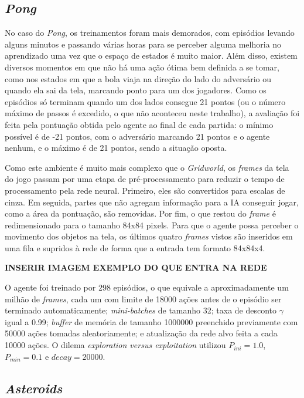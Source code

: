 \subsection{\textit{Pong}}
\label{sec:exp_pong}

No caso do \textit{Pong}, os treinamentos foram mais demorados, com episódios levando alguns minutos e passando várias horas para se perceber alguma melhoria no aprendizado uma vez que o espaço de estados é muito maior.
Além disso, existem diversos momentos em que não há uma ação ótima bem definida a se tomar, como nos estados em que a bola viaja na direção do lado do adversário ou quando ela sai da tela, marcando ponto para um dos jogadores.
Como os episódios só terminam quando um dos lados consegue 21 pontos (ou o número máximo de passos é excedido, o que não aconteceu neste trabalho), a avaliação foi feita pela pontuação obtida pelo agente ao final de cada partida:
o mínimo possível é de -21 pontos, com o adversário marcando 21 pontos e o agente nenhum, e o máximo é de 21 pontos, sendo a situação oposta.

Como este ambiente é muito mais complexo que o \textit{Gridworld}, os \textit{frames} da tela do jogo passam por uma etapa de pré-processamento para reduzir o tempo de processamento pela rede neural.
Primeiro, eles são convertidos para escalas de cinza.
Em seguida, partes que não agregam informação para a IA conseguir jogar, como a área da pontuação, são removidas.
Por fim, o que restou do \textit{frame} é redimensionado para o tamanho 84x84 pixels.
Para que o agente possa perceber o movimento dos objetos na tela, os últimos quatro \textit{frames} vistos são inseridos em uma fila e supridos à rede de forma que a entrada tem formato 84x84x4.

\textbf{INSERIR IMAGEM EXEMPLO DO QUE ENTRA NA REDE}

O agente foi treinado por 298 episódios, o que equivale a aproximadamente um milhão de \textit{frames}, cada um com limite de 18000 ações antes de o episódio ser terminado automaticamente;
\textit{mini-batches} de tamanho 32; taxa de desconto $\gamma$ igual a 0.99;
\textit{buffer} de memória de tamanho 1000000 preenchido previamente com 50000 ações tomadas aleatoriamente;
e atualização da rede alvo feita a cada 10000 ações.
O dilema \textit{exploration versus exploitation} utilizou $P_{ini} = 1.0$, $P_{min} = 0.1$ e $decay = 20000$.

\subsection{\textit{Asteroids}}
\label{sec:exp_asteroids}

